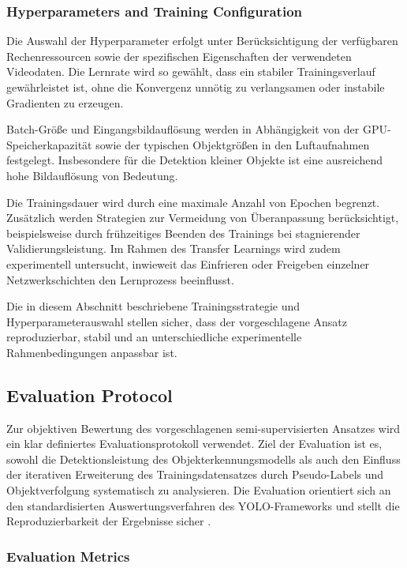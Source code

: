 \subsubsection{Hyperparameters and Training Configuration}

Die Auswahl der Hyperparameter erfolgt unter Berücksichtigung der verfügbaren 
Rechenressourcen sowie der spezifischen Eigenschaften der verwendeten Videodaten. 
Die Lernrate wird so gewählt, dass ein stabiler Trainingsverlauf gewährleistet ist, 
ohne die Konvergenz unnötig zu verlangsamen oder instabile Gradienten zu erzeugen.

Batch-Größe und Eingangsbildauflösung werden in Abhängigkeit von der GPU-Speicherkapazität 
sowie der typischen Objektgrößen in den Luftaufnahmen festgelegt. Insbesondere für 
die Detektion kleiner Objekte ist eine ausreichend hohe Bildauflösung von Bedeutung.

Die Trainingsdauer wird durch eine maximale Anzahl von Epochen begrenzt. Zusätzlich 
werden Strategien zur Vermeidung von Überanpassung berücksichtigt, beispielsweise 
durch frühzeitiges Beenden des Trainings bei stagnierender Validierungsleistung. 
Im Rahmen des Transfer Learnings wird zudem experimentell untersucht, inwieweit das 
Einfrieren oder Freigeben einzelner Netzwerkschichten den Lernprozess beeinflusst.

Die in diesem Abschnitt beschriebene Trainingsstrategie und 
Hyperparameterauswahl stellen sicher, dass der vorgeschlagene Ansatz reproduzierbar, 
stabil und an unterschiedliche experimentelle Rahmenbedingungen anpassbar ist.

\subsection{Evaluation Protocol}

Zur objektiven Bewertung des vorgeschlagenen semi-supervisierten Ansatzes wird ein 
klar definiertes Evaluationsprotokoll verwendet. Ziel der Evaluation ist es, sowohl 
die Detektionsleistung des Objekterkennungsmodells als auch den Einfluss der 
iterativen Erweiterung des Trainingsdatensatzes durch Pseudo-Labels und 
Objektverfolgung systematisch zu analysieren. Die Evaluation orientiert sich an den 
standardisierten Auswertungsverfahren des YOLO-Frameworks und stellt die 
Reproduzierbarkeit der Ergebnisse sicher \cite{ultralytics2024}.

\subsubsection{Evaluation Metrics}

